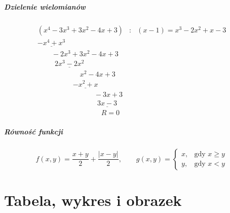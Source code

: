 \documentclass[oneside, fleqn]{book}
\begin{document}
\paragraph{Dzielenie wielomianów}
\begin{displaymath}
\begin{array}{lll}
(x^4 - 3x^3 + 3x^2 -4x + 3) & : & (x-1)  =  x^3 - 2x^2 + x -3 \\
\underline{-x^4 + x^3} & &  \\
\qquad -2x^3 + 3x^2 -4x +3 & & \\
\qquad \ \ \underline{2x^3 - 2x^2} & &\\
\qquad \qquad \qquad x^2 - 4x + 3 & & \\
\qquad \qquad \quad \underline{-x^2 + x}  & & \\
\qquad \qquad \qquad \qquad -3x + 3 & & \\
\qquad \qquad \qquad \qquad \ \ \underline{3x - 3} & & \\
\qquad \qquad \qquad \qquad \quad R = 0 & &
\end{array}
\end{displaymath}

\paragraph{Równość funkcji}
\begin{displaymath}
f(x,y) = \frac{x+y}{2} + \frac{|x-y|}{2}, \qquad g(x,y) = \begin{cases} x, &\textrm{gdy } x \ge y\\y, &\textrm{gdy } x < y \end{cases}
\end{displaymath}
\chapter{Tabela, wykres i obrazek}
\end{document}
